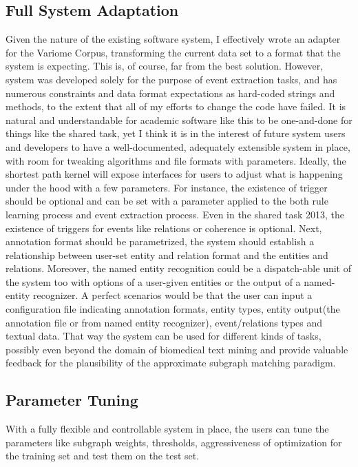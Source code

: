 \subsection{Full System Adaptation}
Given the nature of the existing software system, I effectively wrote an adapter for the Variome Corpus, transforming the current data set to a format that the system is expecting. This is, of course, far from the best solution. However, system was developed solely for the purpose of event extraction tasks, and has numerous constraints and data format expectations as hard-coded strings and methods, to the extent that all of my efforts to change the code have failed. It is natural and understandable for academic software like this to be one-and-done for things like the shared task, yet I think it is in the interest of future system users and developers to have a well-documented, adequately extensible system in place, with room for tweaking algorithms and file formats with parameters. Ideally, the shortest path kernel will expose interfaces for users to adjust what is happening under the hood with a few parameters. For instance, the existence of trigger should be optional and can be set with a parameter applied to the both rule learning process and event extraction process. Even in the shared task 2013, the existence of triggers for events like relations or coherence is optional. Next, annotation format should be parametrized, the system should establish a relationship between user-set entity and relation format and the entities and relations. Moreover, the named entity recognition could be a dispatch-able unit of the system too with options of a user-given entities or the output of a named-entity recognizer. A perfect scenarios would be that the user can input a configuration file indicating annotation formats, entity types, entity output(the annotation file or from named entity recognizer), event/relations types and textual data. That way the system can be used for different kinds of tasks, possibly even beyond the domain of biomedical text mining and provide valuable feedback for the plausibility of the approximate subgraph matching paradigm.   
\subsection{Parameter Tuning}
With a fully flexible and controllable system in place, the users can tune the parameters like subgraph weights, thresholds, aggressiveness of optimization for the training set and test them on the test set. 
